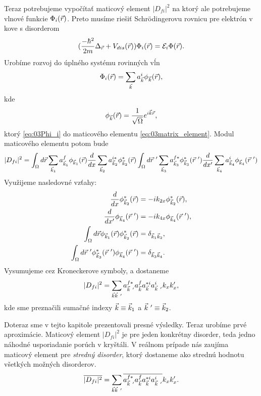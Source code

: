 Teraz potrebujeme vypočítať maticový element $|D_{fi}|^2$ na ktorý ale potrebujeme vlnové funkcie $\Phi_i(\vec{r})$. Preto musíme riešiť Schr\"odingerovu rovnicu pre elektrón v kove s disorderom
\begin{align}
\label{eq:03SchrDis}
(\frac{-\hbar^2}{2m}\Delta_{\vec{r}} + V_{dis}(\vec{r}))\Phi_i(\vec{r})=\mathcal{E}_i\Phi(\vec{r})  \text{.}
\end{align}
Urobíme rozvoj do úplného systému rovinných vĺn
\begin{align}
\label{eq:03Phi_i}
\Phi_i(\vec{r})=\sum_{\vec{k}}a^i_{\vec{k}}\phi_{\vec{k}}(\vec{r})\text{,}\\
\end{align}
kde
\begin{align}
\label{eq:03rov}
\phi_{\vec{k}}(\vec{r})=\frac{1}{\sqrt \Omega}e^{i\vec{k}\vec{r}}\text{,}
\end{align}
ktorý \eqref{eq:03Phi_i} do maticového elementu \eqref{eq:03matrix_element}. Modul maticového elementu potom bude
\begin{align}
\label{eq:03dfisquared}
|D_{fi}|^2=\int_\Omega d\vr \sum_{\vk_1}a_{\vk_1}^f\phi_{\vk_1}(\vr)\frac{d}{dx}\sum_{\vk_2}a_{\vk_2}^{i*}\phi_{\vk_2}^*(\vr)\int_\Omega d\vr\ ' \sum_{\vk_3}a_{\vk_3}^{f*}\phi_{\vk_3}^*(\vr\ ')\frac{d}{dx'}\sum_{\vk_4}a_{\vk_4}^i \phi_{\vk_4}(\vr\ ')
\end{align}
Využijeme nasledovné vzťahy:
\begin{align*}
\frac{d}{dx}\phi_{\vk_2}^*(\vr)&=-ik_{2x}\phi_{\vk_2}^*(\vr)\text{,}\\
\frac{d}{dx'}\phi_{\vk_4}(\vr\ ')&=-ik_{4x}\phi_{\vk_4}(\vr\ ')\text{,}\\
\int_\Omega d\vr \phi_{\vk_1}(\vr)\phi_{\vk_2}^*(\vr)&=\delta_{\vk_1\vk_2}\text{,}\\
\int_\Omega d\vr\ '\phi_{\vk_3}^*(\vr\ ')\phi_{\vk_4}(\vr\ ')&=\delta_{\vk_3\vk_4} \text{.}
\end{align*}
Vysumujeme cez Kroneckerove symboly, a dostaneme
\begin{align}
|D_{fi}|^2=\sum_{\vk\vk\ '} a^{f*}_{\vk\ '}a^f_{\vk}a^{*i}_{\vk}a^i_{\vk\ '}k_xk_x' \text{,}
\end{align}
kde sme preznačili sumačné indexy $\vec{k}\equiv \vec{k}_1$ a $\vec{k}\ '\equiv \vec{k}_2$.

Doteraz sme v tejto kapitole prezentovali presné výsledky. Teraz urobíme prvé aproximácie. Maticový element $|D_{fi}|^2$ je pre jeden konkrétny disorder, teda jedno náhodné usporiadanie porúch v kryštáli. V reálnom prípade nás zaujíma maticový element pre {\it stredný disorder}, ktorý dostaneme ako strednú hodnotu všetkých možných disorderov.
\begin{align}
\label{eq:03dfisq2}
\overline{|D_{fi}|^2}=\sum_{\vk\vk\ '}\overline{a^{f*}_{\vk\ '}a^f_{\vk}a^{*i}_{\vk}a^i_{\vk\ '}}k_xk_x' \text{.} 
\end{align}

